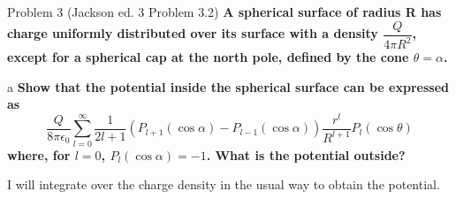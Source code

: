 \begin{homeworkProblem}{Problem 3 (Jackson ed. 3 Problem 3.2)}
\textbf{A spherical surface of radius R has charge uniformly distributed over its surface 
with a density $\dfrac{Q}{4\pi R^2}$, except for a spherical cap at the north pole, defined by the 
cone $\theta = \alpha$.}

\begin{homeworkSection}{a}
\textbf{Show that the potential inside the spherical surface can be expressed as 
\[
\frac{Q}{8 \pi \epsilon_0} \sum\limits_{l=0}^{\infty} \frac{1}{2l+1}\left(P_{l+1}(\cos\alpha) - P_{l-1}(\cos\alpha)\right) \frac{r^l}{R^{l+1}} P_l(\cos\theta)
\]
where, for $l = 0$, $P_l(\cos \alpha) = -1$. What is the potential outside?}


I will integrate over the charge density in the usual way to obtain the potential.


\end{homeworkSection}
\end{homeworkProblem}
